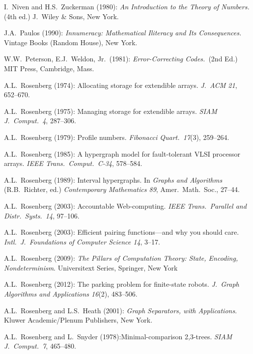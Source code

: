 \begin{thebibliography}{999}
I.~Niven and H.S.~Zuckerman (1980):
{\it An Introduction to the Theory of Numbers.} (4th ed.)
J.~Wiley \& Sons, New York.




J.A.~Paulos (1990):
{\it Innumeracy: Mathematical Iliteracy and Its Consequences.}
Vintage Books (Random House), New York.

W.W.~Peterson, E.J.~Weldon, Jr.~(1981):
{\it Error-Correcting Codes.}~(2nd Ed.)
MIT Press, Cambridge, Mass.



A.L.~Rosenberg (1974): Allocating storage for extendible arrays.  {\it
J.~ACM 21}, 652--670.

A.L.~Rosenberg (1975): Managing storage for extendible arrays.  {\it
SIAM J.~Comput.~4}, 287--306.

A.L.~Rosenberg (1979): Profile numbers.  {\it Fibonacci Quart.~17}(3),
259--264.

A.L.~Rosenberg (1985): A hypergraph model for fault-tolerant VLSI
processor arrays.  {\it IEEE Trans.~Comput.~C-34}, 578--584.

A.L.~Rosenberg (1989): Interval hypergraphs.  In {\it Graphs and
  Algorithms} (R.B.~Richter, ed.) {\it Contemporary Mathematics 89},
Amer.~Math.~Soc., 27--44.

A.L.~Rosenberg (2003): Accountable Web-computing.  {\it IEEE
Trans.~Parallel and Distr.~Systs.~14}, 97--106.

A.L.~Rosenberg (2003): Efficient pairing functions---and why you
should care.  {\it Intl.~J.~Foundations of Computer Science 14},
3--17.

A.L.~Rosenberg (2009):
{\it The Pillars of Computation Theory: State, Encoding,
  Nondeterminism}.
Universitext Series, Springer, New York 

A.L.~Rosenberg (2012): The parking problem for finite-state
robots.  {\it J.~Graph Algorithms and Applications 16}(2),
483--506.

A.L.~Rosenberg and L.S.~Heath (2001):
{\it Graph Separators, with Applications}.
Kluwer Academic/Plenum Publishers, New York.

A.L.~Rosenberg and L.~Snyder (1978):Minimal-comparison 2,3-trees.
{\it SIAM J.~Comput.~7}, 465--480.


\end{thebibliography}
